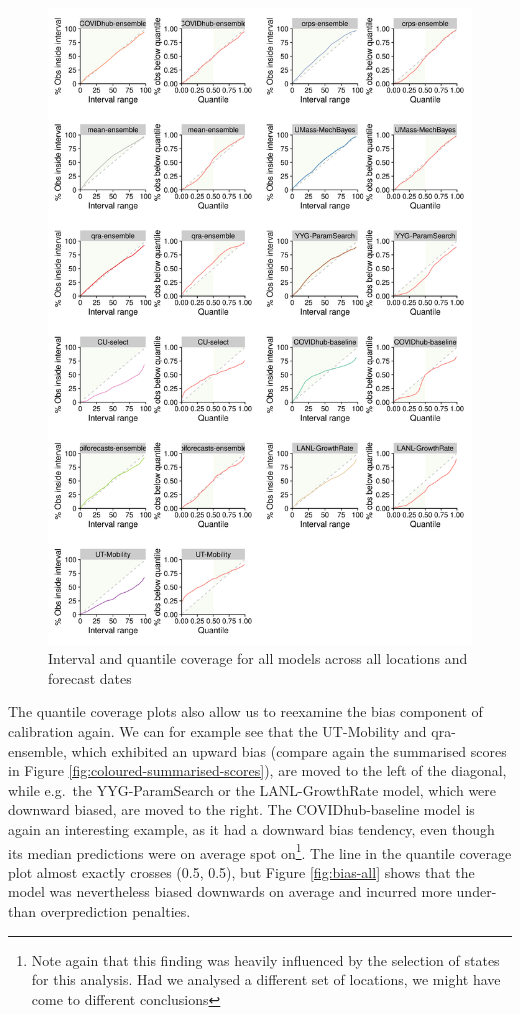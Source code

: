 \documentclass[
]{book}
\begin{document}
\begin{figure}
\includegraphics[width=1\linewidth]{../visualisation/chapter-5-results/scenario-baseline/coverage-plots} \caption{Interval and quantile coverage for all models  across all locations and forecast dates}\label{fig:coverage-all}
\end{figure}

The quantile coverage plots also allow us to reexamine the bias component of calibration again. We can for example see that the UT-Mobility and qra-ensemble, which exhibited an upward bias (compare again the summarised scores in Figure \ref{fig:coloured-summarised-scores}), are moved to the left of the diagonal, while e.g.~the YYG-ParamSearch or the LANL-GrowthRate model, which were downward biased, are moved to the right. The COVIDhub-baseline model is again an interesting example, as it had a downward bias tendency, even though its median predictions were on average spot on\footnote{Note again that this finding was heavily influenced by the selection of states for this analysis. Had we analysed a different set of locations, we might have come to different conclusions}. The line in the quantile coverage plot almost exactly crosses (0.5, 0.5), but Figure \ref{fig:bias-all} shows that the model was nevertheless biased downwards on average and incurred more under- than overprediction penalties.
\end{document}
